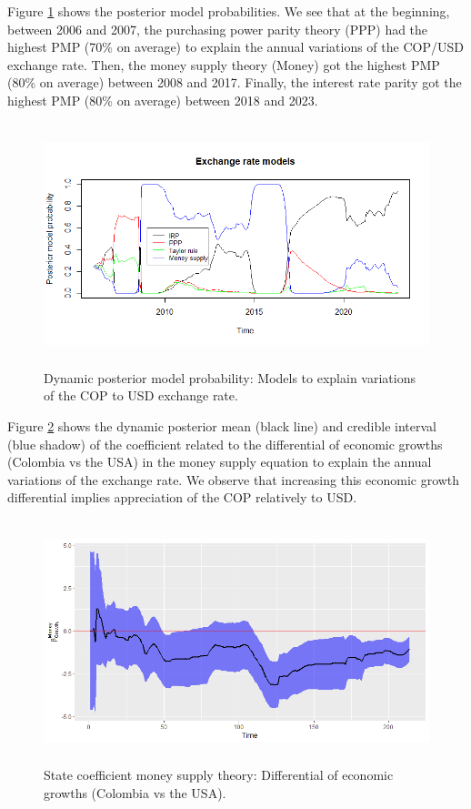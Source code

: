 \begin{enumerate}[leftmargin=*]
Figure \ref{DBMAexcrate} shows the posterior model probabilities. We see that at the beginning, between 2006 and 2007, the purchasing power parity theory (PPP) had the highest PMP (70\% on average) to explain the annual variations of the COP/USD exchange rate. Then, the money supply theory (Money) got the highest PMP (80\% on average) between 2008 and 2017. Finally, the interest rate parity got the highest PMP (80\% on average) between 2018 and 2023.
 
\begin{figure}[!h]
	\includegraphics[width=340pt, height=200pt]{Chapters/chapter10/figures/DBMAexcrate.png}
	\caption[List of figure caption goes here]{Dynamic posterior model probability: Models to explain variations of the COP to USD exchange rate.}\label{DBMAexcrate}
\end{figure}

Figure \ref{GrowthMS} shows the dynamic posterior mean (black line) and credible interval (blue shadow) of the coefficient related to the differential of economic growths (Colombia vs the USA) in the money supply equation to explain the annual variations of the exchange rate. We observe that increasing this economic growth differential implies appreciation of the COP relatively to USD.
  
\begin{figure}[!h]
	\includegraphics[width=340pt, height=200pt]{Chapters/chapter10/figures/GrowthMS.png}
	\caption[List of figure caption goes here]{State coefficient money supply theory: Differential of economic growths (Colombia vs the USA).}\label{GrowthMS}
\end{figure}


\end{enumerate}
